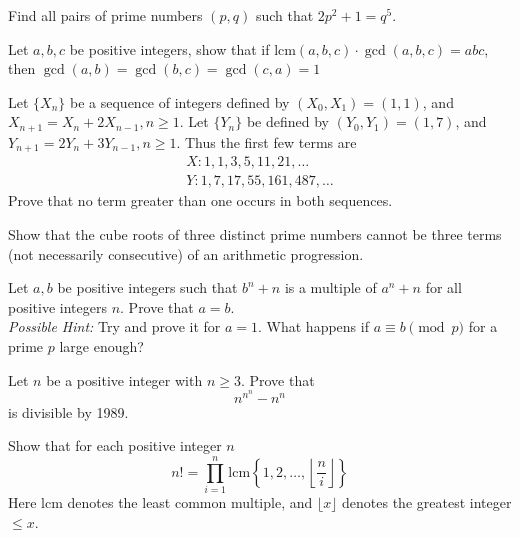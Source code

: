 \begin{problem}[N][4]
    Find all pairs of prime numbers $(p,q)$ such that $2p^2 + 1 = q^5$.
\end{problem}

\begin{problem}
    Let $a,b,c$ be positive integers, show that if $\text{lcm}(a,b,c) \cdot \gcd (a,b,c) = abc$, then $\gcd(a,b) = \gcd(b,c) = \gcd(c,a) = 1$
\end{problem}

\begin{problem}[N][5][USAMO 1973/2]
    Let $\{ X_n \}$ be a sequence of integers defined by $(X_0, X_1) = (1,1)$, and $X_{n+1} = X_n + 2X_{n-1} , n \geq 1$. Let $\{Y_n\}$ be defined by $(Y_0, Y_1) = (1,7)$, and $Y_{n+1} = 2Y_n + 3Y_{n-1}, n \geq 1$. Thus the first few terms are
    \begin{align*}
        X : 1,1,3, 5, 11, 21, \ldots \\
        Y: 1, 7, 17, 55, 161, 487, \ldots
    \end{align*}
    Prove that no term greater than one occurs in both sequences.
\end{problem}

\begin{problem}[N][8][USAMO 1973]
   Show that the cube roots of three distinct prime numbers cannot be three terms (not necessarily consecutive) of an arithmetic progression.
\end{problem}

\begin{problem}[N][7][ISL 2005/6]
   Let $a,b$ be positive integers such that $b^n+n$ is a multiple of $a^n+n$ for all positive integers $n$. Prove that $a=b$.\\[2mm]
   \emph{Possible Hint:} Try and prove it for $a=1$. What happens if $a \equiv  b \pmod p$ for a prime $p$ large enough?
\end{problem}

\begin{problem}[N][5][Balkan]
    Let $n$ be a positive integer with $n \geq 3$. Prove that 
    $$n^{n^n} - n^n$$
    is divisible by 1989.
\end{problem}

\begin{problem}[N][7][Putnam 2003/B3]
    Show that for each positive integer $n$
    $$  n! = \prod_{i=1}^n \text{lcm} 
    \left \{ 1, 2, \ldots, \left \lfloor \frac{n}{i} \right \rfloor \right \}$$
    Here lcm denotes the least common multiple, and $\lfloor x \rfloor$ denotes the greatest integer $\leq x$.
\end{problem}

